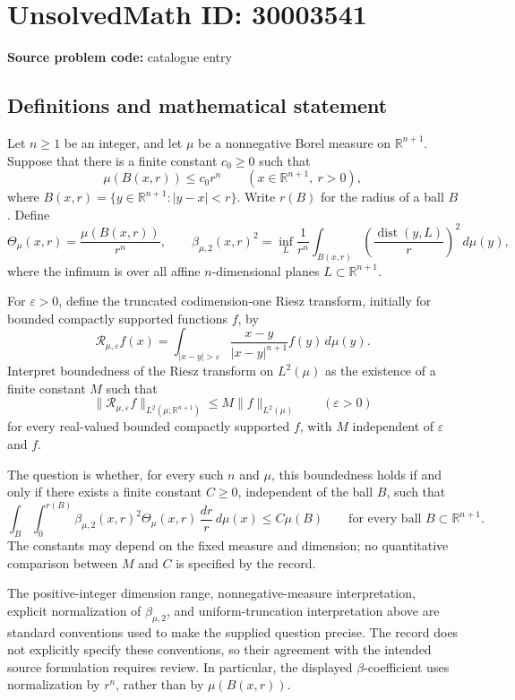 \documentclass[11pt]{article}
\newcommand{\R}{\mathbb{R}}
\begin{document}
\section*{UnsolvedMath ID: 30003541}
\textbf{Source problem code:} catalogue entry
\subsection{Definitions and mathematical statement}
Let \(n\geq 1\) be an integer, and let \(\mu\) be a nonnegative Borel measure on \(\R^{n+1}\). Suppose that there is a finite constant \(c_0\geq 0\) such that
\[
\mu(B(x,r))\leq c_0r^n\qquad(x\in\R^{n+1},\ r>0),
\]
where \(B(x,r)=\{y\in\R^{n+1}:|y-x|<r\}\). Write \(r(B)\) for the radius of a ball \(B\). Define
\[
\Theta_\mu(x,r)=\frac{\mu(B(x,r))}{r^n},\qquad
\beta_{\mu,2}(x,r)^2
=\inf_L\frac{1}{r^n}\int_{B(x,r)}
\left(\frac{\operatorname{dist}(y,L)}{r}\right)^2\,d\mu(y),
\]
where the infimum is over all affine \(n\)-dimensional planes \(L\subset\R^{n+1}\).

For \(\varepsilon>0\), define the truncated codimension-one Riesz transform, initially for bounded compactly supported functions \(f\), by
\[
\mathcal R_{\mu,\varepsilon}f(x)
=\int_{|x-y|>\varepsilon}
\frac{x-y}{|x-y|^{n+1}}f(y)\,d\mu(y).
\]
Interpret boundedness of the Riesz transform on \(L^2(\mu)\) as the existence of a finite constant \(M\) such that
\[
\|\mathcal R_{\mu,\varepsilon}f\|_{L^2(\mu;\R^{n+1})}
\leq M\|f\|_{L^2(\mu)}
\qquad(\varepsilon>0)
\]
for every real-valued bounded compactly supported \(f\), with \(M\) independent of \(\varepsilon\) and \(f\).

The question is whether, for every such \(n\) and \(\mu\), this boundedness holds if and only if there exists a finite constant \(C\geq 0\), independent of the ball \(B\), such that
\[
\int_B\int_0^{r(B)}
\beta_{\mu,2}(x,r)^2\Theta_\mu(x,r)
\,\frac{dr}{r}\,d\mu(x)
\leq C\mu(B)
\qquad\text{for every ball }B\subset\R^{n+1}.
\]
The constants may depend on the fixed measure and dimension; no quantitative comparison between \(M\) and \(C\) is specified by the record.

The positive-integer dimension range, nonnegative-measure interpretation, explicit normalization of \(\beta_{\mu,2}\), and uniform-truncation interpretation above are standard conventions used to make the supplied question precise. The record does not explicitly specify these conventions, so their agreement with the intended source formulation requires review. In particular, the displayed \(\beta\)-coefficient uses normalization by \(r^n\), rather than by \(\mu(B(x,r))\).
\end{document}
